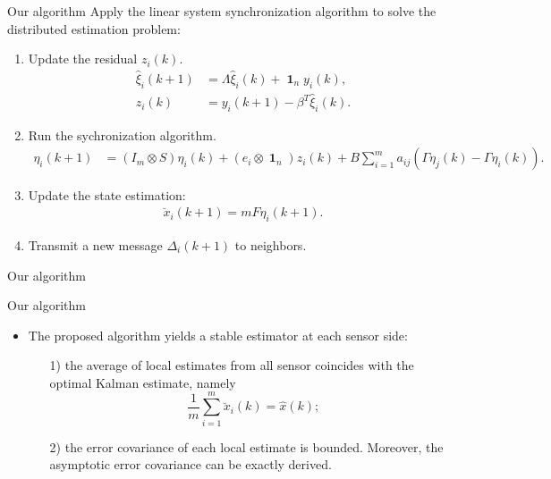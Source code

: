 \documentclass[10pt]{beamer}
\DeclareMathOperator{\1}{\textbf{1}}
\begin{document}
	  \begin{frame}{Our algorithm}
	    Apply the linear system synchronization algorithm to solve the distributed estimation problem:
	    \begin{enumerate}
	      \item \textcolor{thupurple}{Update the residual} $z_i(k)$.
		\begin{align*}
		  \hat\xi_i(k+1)&=\Lambda\hat\xi_i(k)+\1_ny_i(k),\\
		  z_i(k)&=y_i(k+1)-\beta^T\hat\xi_i(k).
		\end{align*}
	      \item Run the \textcolor{thupurple}{sychronization} algorithm.
		\begin{align*}
		  \eta_i(k+1)&=(I_m\otimes S)\eta_i(k) +(e_i\otimes\1_n)z_i(k)+
		  B\sum_{i=1}^m a_{ij}(\Gamma \eta_j(k)-\Gamma \eta_i(k)).
		\end{align*}
	      \item Update the state estimation:
		\begin{align*}
		  \breve x_i(k+1)=mF\eta_i(k+1).
		\end{align*}
	      \item Transmit a new message $\Delta_i(k+1)$ to neighbors.
	    \end{enumerate}
	  \end{frame}

	  \begin{frame}{Our algorithm}
	    \begin{figure}
	      \centering
	      \resizebox{0.63\textwidth}{!}{}
	    \end{figure}
	  \end{frame}

	  \begin{frame}{Our algorithm}
	    \begin{itemize}
	      \item The proposed algorithm yields a \textcolor{thupurple}{stable estimator} at each sensor side:
		\begin{enumerate}
		  \item[1)] the average of local estimates from all sensor coincides with the optimal Kalman estimate, namely
		    \begin{equation}
		      \frac{1}{m}\sum_{i=1}^m \breve{x}_i(k)=\hat{x}(k);
		    \end{equation}
		  \item[2)] the error covariance of each local estimate is bounded. Moreover, the asymptotic error covariance can be exactly derived.
		\end{enumerate} 
	    \end{itemize}
	  \end{frame}
\end{document}
